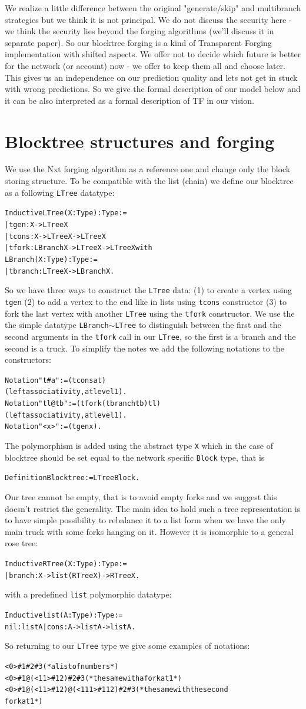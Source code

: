 \documentclass[12pt]{article}
\newcommand{\begver}{\begin{alltt}\begin{footnotesize}}
\newcommand{\enver}{\end{footnotesize}\end{alltt}}
\begin{document}
We realize a little difference between the original "generate/skip" and multibranch strategies but 
we think it is not principal. We do not discuss the security here \-- we think the security lies beyond the forging algorithms (we'll discuss it in separate 
paper). So our blocktree forging is a kind of Transparent Forging implementation with shifted aspects. We offer not to decide which future is better for the 
network (or account) now \-- we offer to keep them all and choose later. This gives us an independence on our prediction 
quality and lets not get in stuck with wrong predictions. 
So we give the formal description of our model below and it can be also interpreted as a formal description of TF in our vision.

\section{Blocktree structures and forging}
We use the Nxt forging algorithm as a reference one and change only the block storing structure. To be compatible with the list (chain) we define our blocktree as a 
following \texttt{LTree} datatype:
\begver
Inductive LTree (X: Type) : Type :=
| tgen : X -> LTree X
| tcons : X -> LTree X -> LTree X
| tfork : LBranch X -> LTree X -> LTree X  with 
  LBranch (X: Type) : Type := 
  | tbranch : LTree X -> LBranch X.
\enver
So we have three ways to construct the \texttt{LTree} data: (1) to create a vertex using \texttt{tgen} (2) to add a vertex to the end like in lists using
\texttt{tcons} constructor (3) to fork the last vertex with another \texttt{LTree} using the \texttt{tfork} constructor. We use the the simple datatype
\texttt{LBranch}$\sim$\texttt{LTree} to distinguish between the first and the second arguments in the \texttt{tfork} call in our \texttt{LTree}, so the first is a branch and the 
second is a truck. To simplify the notes we add the following notations to the constructors:
\begver
Notation "t # a" := (tcons a t) 
                     (left associativity, at level 1).
Notation "tl @ tb" := (tfork (tbranch tb) tl) 
                     (left associativity, at level 1).
Notation "< x >" := (tgen x).
\enver 
The polymorphism is added using the abstract type \texttt{X} which in the case of blocktree should be set equal to the network specific \texttt{Block}
type, that is
\begver
Definition Blocktree := LTree Block.
\enver 
Our tree cannot be empty, that is to avoid empty forks and we suggest this doesn't restrict the generality. The main idea to hold such a tree representation
is to have simple possibility to rebalance it to a list form when we have the only main truck with some forks hanging on it. However it is isomorphic to a general 
rose tree:
\begver
Inductive RTree (X:Type) : Type :=
| branch : X -> list (RTree X) -> RTree X.
\enver 
with a predefined \texttt{list} polymorphic datatype:
\begver
Inductive list (A : Type) : Type :=
    nil : list A | cons : A -> list A -> list A.
\enver
So returning to our \texttt{LTree} type we give some examples of notations:
\begver
<0> # 1 # 2 # 3 (*a list of numbers*)
<0> # 1 @ (<11> # 12) # 2 # 3 (*the same with a fork at 1*)
<0> # 1 @ (<11> # 12) @ (<111> # 112) # 2 # 3 (*the same with the second 
                                                fork at 1*)
\enver
\end{document}
